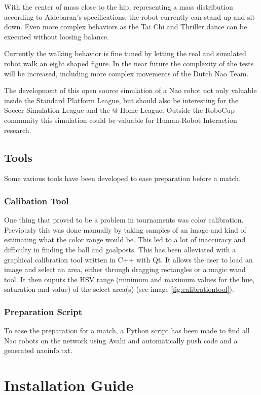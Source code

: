 \documentclass[11pt,a4paper,oneside]{article}
\begin{document}
With the center of mass close to the hip, representing a mass distribution according to Aldebaran's specifications, the robot currently can stand up and sit-down. Even more complex behaviors as the Tai Chi and Thriller dance can be executed without loosing balance.

Currently the walking behavior is fine tuned by letting the real and simulated robot walk an eight shaped figure. In the near future the complexity of the tests will be increased, including more complex movements of the Dutch Nao Team.

The development of this open source simulation of a Nao robot not only valuable inside the Standard Platform League, but should also be interesting for the Soccer Simulation League and the @ Home League. Outside the RoboCup community this simulation could be valuable for Human-Robot Interaction research.

\subsection{Tools}
Some various tools have been developed to ease preparation before a match. 

\subsubsection{Calibation Tool}
One thing that proved to be a problem in tournaments was color calibration. Previously this was done manually by taking samples of an image and kind of estimating what the color range would be. This led to a lot of inaccuracy and difficulty in finding the ball and goalposts. This has been alleviated with a graphical calibration tool written in C++ with Qt. It allows the user to load an image and select an area, either through dragging rectangles or a magic wand tool. It then ouputs the HSV range (minimum and maximum values for the hue, saturation and value) of the select area(s) (see image \ref{fig:calibrationtool}).

\subsubsection{Preparation Script}
To ease the preparation for a match, a Python script has been made to find all Nao robots on the network using Avahi and automatically push code and a generated naoinfo.txt. 

\section{Installation Guide}
\end{document}
